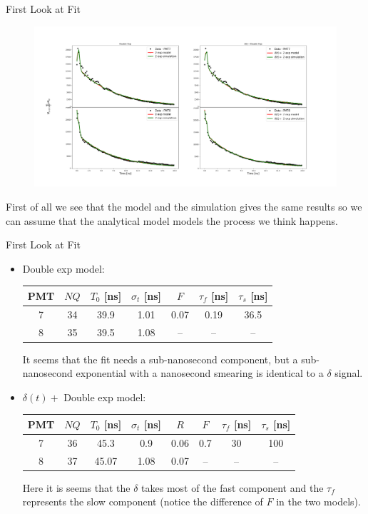 \documentclass{beamer}
\begin{document}
\begin{frame}{First Look at Fit}
\begin{figure}[h]
\includegraphics[width=1\textwidth]{fitA.png}
\end{figure}
First of all we see that the model and the simulation gives the same results so we can assume that the analytical model models the process we think happens.
\end{frame}

\begin{frame}{First Look at Fit}
\begin{itemize}

\item Double exp model:
\begin{center}
\begin{tabular}{|c||c|c|c|c|c|c|} 
\hline
PMT & $NQ$ & $T_0$ [ns]& $\sigma_t$ [ns] & $F$ & $\tau_f$ [ns] & $\tau_s$ [ns]\\ 
\hline\hline
7 & 34 & 39.9 & 1.01 & 0.07 & 0.19 & 36.5 \\
\hline
8 & 35 & 39.5 & 1.08 & -- & -- & -- \\
\hline
\end{tabular}
\end{center} 
It seems that the fit needs a sub-nanosecond component, but a sub-nanosecond exponential with a nanosecond smearing is identical to a $\delta$ signal.


\item $\delta(t)+$ Double exp model:
\begin{center}
\begin{tabular}{|c||c|c|c|c|c|c|c|} 
\hline
PMT & $NQ$ & $T_0$ [ns]& $\sigma_t$ [ns] & $R$ & $F$ & $\tau_f$ [ns] & $\tau_s$ [ns]\\ 
\hline\hline
7 & 36 & 45.3 & 0.9 & 0.06 & 0.7 & 30 & 100 \\
\hline
8 & 37 & 45.07 & 1.08 & 0.07 & -- & -- & -- \\
\hline
\end{tabular}
\end{center} 
Here it is seems that the $\delta$ takes most of the fast component and the $\tau_f$  represents the slow component (notice the difference of $F$ in the two models).
\end{itemize}

\end{frame}
\end{document}
